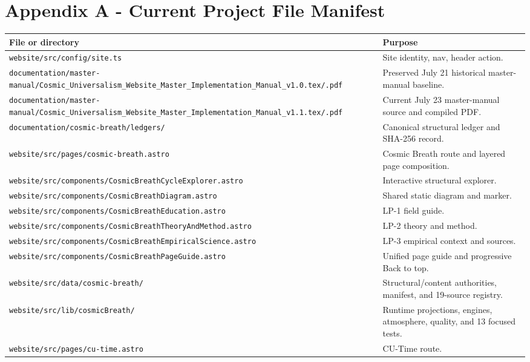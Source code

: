 \documentclass[11pt,letterpaper]{article}
\newcommand{\filepath}[1]{\nolinkurl{#1}}
\begin{document}
\section{Appendix A - Current Project File Manifest}

\begin{longtable}{L{2.75in}L{3.65in}}
\toprule
\textbf{File or directory} & \textbf{Purpose} \\
\midrule
\filepath{website/src/config/site.ts} & Site identity, nav, header action. \\
\filepath{documentation/master-manual/Cosmic\_Universalism\_Website\_Master\_Implementation\_Manual\_v1.0.tex/.pdf} & Preserved July 21 historical master-manual baseline. \\
\filepath{documentation/master-manual/Cosmic\_Universalism\_Website\_Master\_Implementation\_Manual\_v1.1.tex/.pdf} & Current July 23 master-manual source and compiled PDF. \\
\filepath{documentation/cosmic-breath/ledgers/} & Canonical structural ledger and SHA-256 record. \\
\filepath{website/src/pages/cosmic-breath.astro} & Cosmic Breath route and layered page composition. \\
\filepath{website/src/components/CosmicBreathCycleExplorer.astro} & Interactive structural explorer. \\
\filepath{website/src/components/CosmicBreathDiagram.astro} & Shared static diagram and marker. \\
\filepath{website/src/components/CosmicBreathEducation.astro} & LP-1 field guide. \\
\filepath{website/src/components/CosmicBreathTheoryAndMethod.astro} & LP-2 theory and method. \\
\filepath{website/src/components/CosmicBreathEmpiricalScience.astro} & LP-3 empirical context and sources. \\
\filepath{website/src/components/CosmicBreathPageGuide.astro} & Unified page guide and progressive Back to top. \\
\filepath{website/src/data/cosmic-breath/} & Structural/content authorities, manifest, and 19-source registry. \\
\filepath{website/src/lib/cosmicBreath/} & Runtime projections, engines, atmosphere, quality, and 13 focused tests. \\
\filepath{website/src/pages/cu-time.astro} & CU-Time route. \\

\end{longtable}
\end{document}
